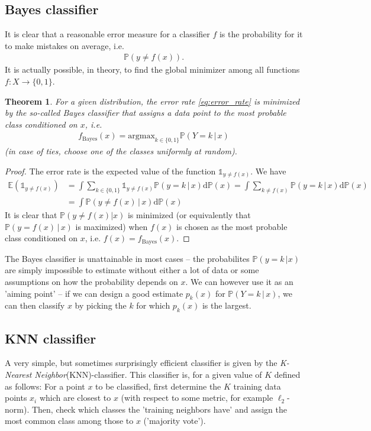 \documentclass{article}
\newcommand{\erw}{\mathbb{E}} %
\newtheorem{theorem}{Theorem}
\newcommand{\one}{\mathds{1}}
\begin{document}
\subsection{Bayes classifier} 
It is clear that a reasonable error measure for a classifier $f$ is the probability for it to make mistakes on average, i.e.
\begin{align} \label{eq:error_rate}
    \mathbb{P}(y\neq f(x)).
\end{align}
It is actually possible, in theory, to find the global minimizer among all functions $f:X\to \{0,1\}$. 
\begin{theorem}
    For a given distribution, the error rate \eqref{eq:error_rate} is minimized by the so-called \emph{Bayes classifier} that assigns a data point to the most probable class conditioned on $x$, i.e.
    \begin{align*}
        f_{\mathrm{Bayes}}(x) = \mathrm{argmax}_{k\in \{0,1\}} \mathbb{P}(Y=k \, \vert \, x)
    \end{align*}
    (in case of ties, choose one of the classes uniformly at random).
\end{theorem}
\begin{proof}
    The error rate is the expected value of the function $\one_{y \neq f(x)}$. We have
    \begin{align*}
        \erw(\one_{y\neq f(x)}) &= \int \sum_{k\in \{0,1\}} \one_{y\neq f(x)} \mathbb{P}(y=k \, \vert \, x) \mathrm{d}\mathbb{P}(x) = \int \sum_{k\neq f(x)}  \mathbb{P}(y=k \, \vert \, x) \mathrm{d}\mathbb{P}(x) \\
        &= \int  \mathbb{P}(y\neq f(x) \, \vert \, x) \mathrm{d}\mathbb{P}(x) 
    \end{align*}
    It is clear that $\mathbb{P}(y\neq f(x) \vert x)$ is minimized (or equivalently that $\mathbb{P}(y=f(x) \, \vert \, x)$ is maximized) when $f(x)$ is chosen as the most probable class conditioned on $x$, i.e. $f(x)=f_{\mathrm{Bayes}}(x)$.
\end{proof}
The Bayes classifier is unattainable in most cases -- the probabilites $\mathbb{P}(y=k \, \vert x)$ are simply impossible to estimate without either a lot of data or some assumptions on how the probability depends on $x$. We can however use it as an 'aiming point' -- if we can design a good estimate $p_k(x)$ for $\mathbb{P}(Y=k\, \vert \, x)$, we can then classify $x$ by picking the $k$ for which $p_k(x)$ is the largest.

\subsection{KNN classifier} A very simple, but sometimes surprisingly efficient classifier is given by the \emph{K-Nearest Neighbor}(KNN)-classifier. This classifier is, for a given value of $K$ defined as follows: For a point $x$ to be classified, first determine the $K$ training data points $x_i$ which are closest to $x$ (with respect to  some metric, for example $\ell_2$-norm). Then, check which classes the 'training neighbors have' and assign the most common class among those to $x$ ('majority vote').
\end{document}
